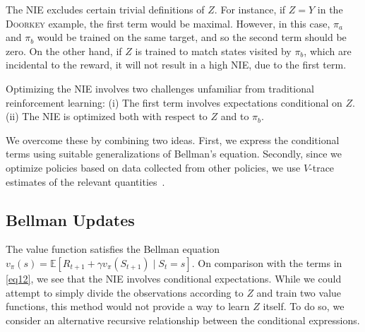 \documentclass[letterpaper]{article} %
\newcommand{\EE}{\mathbb{E}}
\newcommand{\NIE}{\textrm{NIE}\xspace}
\newcommand{\doorkey}{\textsc{Doorkey}\xspace}
\begin{document}
	The \NIE excludes certain trivial definitions of $Z$. For instance, if $Z=Y$ in the \doorkey example, the first term would be maximal. However, in this case, $\pi_a$ and $\pi_b$ would be trained on the same target, and so the second term should be zero. On the other hand, if $Z$ is trained to match states visited by $\pi_b$, which are incidental to the reward, it will not result in a high \NIE, due to the first term. %
	
	
	Optimizing the \NIE involves two challenges unfamiliar from traditional reinforcement learning: (i)  %
	The first term involves expectations conditional on $Z$. %
	(ii) %
	The \NIE is optimized both with respect to $Z$ and to $\pi_b$.
	
	
	We overcome these by combining two ideas. First, we express the conditional terms using suitable generalizations of Bellman's equation. %
	Secondly, since we optimize policies based on data collected from other policies, we use $V$-trace estimates of the relevant quantities~\cite{espeholt2018impala}.
	
	\subsection{Bellman Updates}
	The value function satisfies the Bellman equation $v_\pi(s) = \EE\left[R_{t+1} + \gamma v_\pi(S_{t+1}) \mid S_t = s\right]$. On comparison with the terms in \cref{eq12}, we see that the \NIE involves conditional expectations. 
	While we could attempt to simply divide the observations according to $Z$ and train two value functions, this method would not provide a way to learn $Z$ itself. To do so, we consider an alternative recursive relationship between the conditional expressions. %
	
\end{document}
